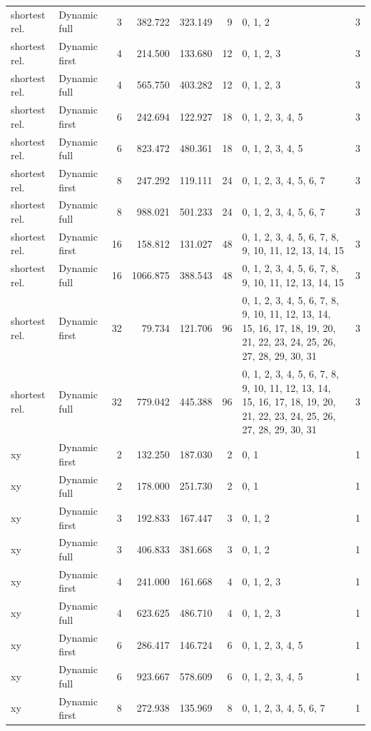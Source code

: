 \documentclass[10pt,a4paper]{article}
\begin{document}
\begin{longtable}{@{}p{23mm}p{29mm}rrrrp{36mm}r@{}}
shortest rel. & Dynamic full & 3 & 382.722 & 323.149 & 9 & 0, 1, 2 & 3 \\
shortest rel. & Dynamic first & 4 & 214.500 & 133.680 & 12 & 0, 1, 2, 3 & 3 \\
shortest rel. & Dynamic full & 4 & 565.750 & 403.282 & 12 & 0, 1, 2, 3 & 3 \\
shortest rel. & Dynamic first & 6 & 242.694 & 122.927 & 18 & 0, 1, 2, 3, 4, 5 & 3 \\
shortest rel. & Dynamic full & 6 & 823.472 & 480.361 & 18 & 0, 1, 2, 3, 4, 5 & 3 \\
shortest rel. & Dynamic first & 8 & 247.292 & 119.111 & 24 & 0, 1, 2, 3, 4, 5, 6, 7 & 3 \\
shortest rel. & Dynamic full & 8 & 988.021 & 501.233 & 24 & 0, 1, 2, 3, 4, 5, 6, 7 & 3 \\
shortest rel. & Dynamic first & 16 & 158.812 & 131.027 & 48 & 0, 1, 2, 3, 4, 5, 6, 7, 8, 9, 10, 11, 12, 13, 14, 15 & 3 \\
shortest rel. & Dynamic full & 16 & 1066.875 & 388.543 & 48 & 0, 1, 2, 3, 4, 5, 6, 7, 8, 9, 10, 11, 12, 13, 14, 15 & 3 \\
shortest rel. & Dynamic first & 32 & 79.734 & 121.706 & 96 & 0, 1, 2, 3, 4, 5, 6, 7, 8, 9, 10, 11, 12, 13, 14, 15, 16, 17, 18, 19, 20, 21, 22, 23, 24, 25, 26, 27, 28, 29, 30, 31 & 3 \\
shortest rel. & Dynamic full & 32 & 779.042 & 445.388 & 96 & 0, 1, 2, 3, 4, 5, 6, 7, 8, 9, 10, 11, 12, 13, 14, 15, 16, 17, 18, 19, 20, 21, 22, 23, 24, 25, 26, 27, 28, 29, 30, 31 & 3 \\
xy & Dynamic first & 2 & 132.250 & 187.030 & 2 & 0, 1 & 1 \\
xy & Dynamic full & 2 & 178.000 & 251.730 & 2 & 0, 1 & 1 \\
xy & Dynamic first & 3 & 192.833 & 167.447 & 3 & 0, 1, 2 & 1 \\
xy & Dynamic full & 3 & 406.833 & 381.668 & 3 & 0, 1, 2 & 1 \\
xy & Dynamic first & 4 & 241.000 & 161.668 & 4 & 0, 1, 2, 3 & 1 \\
xy & Dynamic full & 4 & 623.625 & 486.710 & 4 & 0, 1, 2, 3 & 1 \\
xy & Dynamic first & 6 & 286.417 & 146.724 & 6 & 0, 1, 2, 3, 4, 5 & 1 \\
xy & Dynamic full & 6 & 923.667 & 578.609 & 6 & 0, 1, 2, 3, 4, 5 & 1 \\
xy & Dynamic first & 8 & 272.938 & 135.969 & 8 & 0, 1, 2, 3, 4, 5, 6, 7 & 1 \\

\end{longtable}
\end{document}
